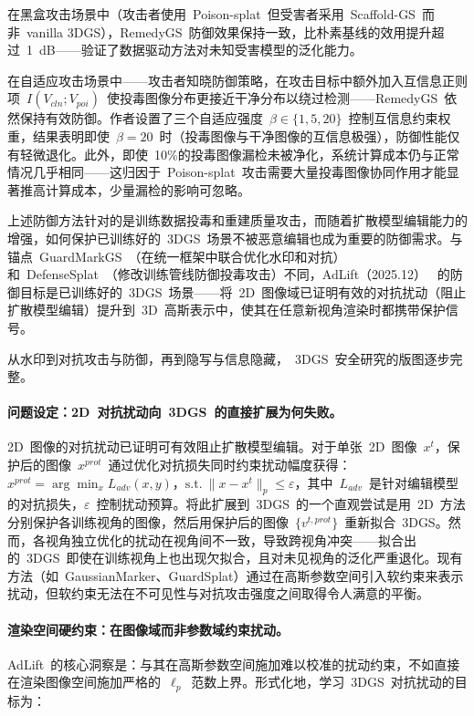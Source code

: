 在黑盒攻击场景中（攻击者使用~Poison-splat~但受害者采用~Scaffold-GS~而非~vanilla 3DGS），RemedyGS~防御效果保持一致，比朴素基线的效用提升超过~1~dB——验证了数据驱动方法对未知受害模型的泛化能力。

在自适应攻击场景中——攻击者知晓防御策略，在攻击目标中额外加入互信息正则项~$I(V_{cln}; V_{poi})$~使投毒图像分布更接近干净分布以绕过检测——RemedyGS~依然保持有效防御。作者设置了三个自适应强度~$\beta \in \{1, 5, 20\}$~控制互信息约束权重，结果表明即使~$\beta = 20$~时（投毒图像与干净图像的互信息极强），防御性能仅有轻微退化。此外，即使~10\%的投毒图像漏检未被净化，系统计算成本仍与正常情况几乎相同——这归因于~Poison-splat~攻击需要大量投毒图像协同作用才能显著推高计算成本，少量漏检的影响可忽略。

上述防御方法针对的是训练数据投毒和重建质量攻击，而随着扩散模型编辑能力的增强，如何保护已训练好的~3DGS~场景不被恶意编辑也成为重要的防御需求。与锚点~GuardMarkGS~（在统一框架中联合优化水印和对抗）和~DefenseSplat~（修改训练管线防御投毒攻击）不同，AdLift（2025.12）~\cite{2512_07247} 的防御目标是已训练好的~3DGS~场景——将~2D~图像域已证明有效的对抗扰动（阻止扩散模型编辑）提升到~3D~高斯表示中，使其在任意新视角渲染时都携带保护信号。

从水印到对抗攻击与防御，再到隐写与信息隐藏，~3DGS~安全研究的版图逐步完整。

\paragraph{问题设定：2D~对抗扰动向~3DGS~的直接扩展为何失败。}
2D~图像的对抗扰动已证明可有效阻止扩散模型编辑。对于单张~2D~图像~$x^t$，保护后的图像~$x^{prot}$~通过优化对抗损失同时约束扰动幅度获得：$x^{prot} = \arg\min_x L_{adv}(x, y)$，$\text{s.t.}~\|x - x^t\|_p \leq \varepsilon$，其中~$L_{adv}$~是针对编辑模型的对抗损失，$\varepsilon$~控制扰动预算。将此扩展到~3DGS~的一个直观尝试是用~2D~方法分别保护各训练视角的图像，然后用保护后的图像~$\{v^{t,prot}\}$~重新拟合~3DGS。然而，各视角独立优化的扰动在视角间不一致，导致跨视角冲突——拟合出的~3DGS~即使在训练视角上也出现欠拟合，且对未见视角的泛化严重退化。现有方法（如~GaussianMarker、GuardSplat）通过在高斯参数空间引入软约束来表示扰动，但软约束无法在不可见性与对抗攻击强度之间取得令人满意的平衡。

\paragraph{渲染空间硬约束：在图像域而非参数域约束扰动。}
AdLift~的核心洞察是：与其在高斯参数空间施加难以校准的扰动约束，不如直接在渲染图像空间施加严格的~$\ell_p$~范数上界。形式化地，学习~3DGS~对抗扰动的目标为：

